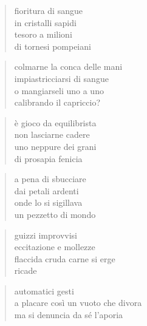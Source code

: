 \clearpage


\vspace*{2cm}

	\begin{verse}
		fioritura di sangue\\
		in cristalli sapidi\\
		tesoro a milioni\\
		di tornesi pompeiani
	\end{verse}

	\begin{verse}
		colmarne la conca delle mani\\
		impiastricciarsi di sangue\\
		o mangiarseli uno a uno\\
		calibrando il capriccio?
	\end{verse}

	\begin{verse}
		è gioco da equilibrista\\
		non lasciarne cadere\\
		uno neppure dei grani\\
		di prosapia fenicia
	\end{verse}

	\begin{verse}
		a pena di sbucciare\\
		dai petali ardenti\\
		onde lo si sigillava\\
		un pezzetto di mondo
	\end{verse}

\clearpage


\vspace*{2cm}

	\begin{verse}
                guizzi improvvisi\\
                eccitazione e mollezze\\
                flaccida cruda carne si erge\\
                ricade
	\end{verse}

	\begin{verse}
                automatici gesti\\
                a placare così un vuoto che divora\\
                ma si denuncia da sé l’aporia
	\end{verse}

